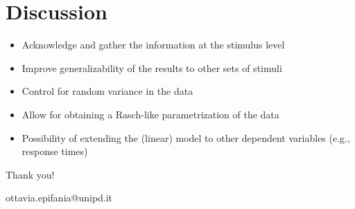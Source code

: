 \documentclass[compress]{beamer}
\begin{document}
\section{Discussion}

\begin{frame}
	\begin{itemize}
		\item Acknowledge and gather the information at the stimulus level
	\item Improve generalizability of the results to other sets of stimuli 

\item Control for random variance in the data 

\item Allow for obtaining a Rasch-like parametrization of the data 

\item Possibility of extending the (linear) model to other dependent variables (e.g., response times)
		
	\end{itemize}
\end{frame}


\begin{frame}
	\begin{center}
		\begin{Large}
			Thank you!
		\end{Large}
		
		ottavia.epifania@unipd.it
	\end{center}
	
	
\end{frame}
\end{document}
